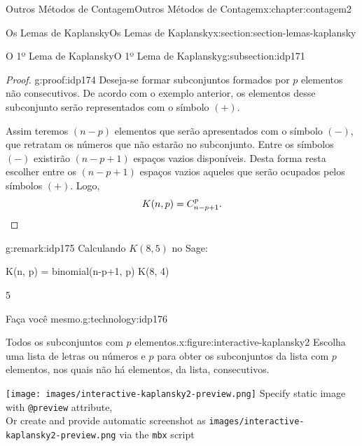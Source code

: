 \documentclass[oneside,10pt,]{book}
\newcommand{\mono}[1]{\texttt{#1}}
\newcommand{\qedhere}{\relax}
\numberwithin{equation}{section}
\newlength{\qrsize}
\newlength{\previewwidth}
\begin{document}
\begin{chapterptx}{Outros Métodos de Contagem}{}{Outros Métodos de Contagem}{}{}{x:chapter:contagem2}
\begin{sectionptx}{Os Lemas de Kaplansky}{}{Os Lemas de Kaplansky}{}{}{x:section:section-lemas-kaplansky}
\begin{subsectionptx}{O 1º Lema de Kaplansky}{}{O 1º Lema de Kaplansky}{}{}{g:subsection:idp171}
\begin{proof}{}{g:proof:idp174}
Deseja-se formar subconjuntos formados por \(p\) elementos não consecutivos. De acordo com o exemplo anterior, os elementos desse subconjunto serão representados com o símbolo \((+)\).%
\par
Assim teremos \((n-p)\) elementos que serão apresentados com o símbolo \((-)\), que retratam os números que não estarão no subconjunto. Entre os símbolos \((-)\) existirão \((n-p+1)\) espaços vazios disponíveis. Desta forma resta escolher entre os \((n-p+1)\) espaços vazios aqueles que serão ocupados pelos símbolos \((+)\). Logo,%
\begin{equation*}
K(n,p)=C_{n-p+1}^p.\qedhere
\end{equation*}
%
\end{proof}
\begin{remark}{}{g:remark:idp175}%
Calculando \(K(8, 5)\) no Sage:%
\begin{sageinput}
K(n, p) = binomial(n-p+1, p) 
K(8, 4)
\end{sageinput}
\begin{sageoutput}
5
\end{sageoutput}
\end{remark}
\begin{technology}{Faça você mesmo.}{g:technology:idp176}%
\begin{figureptx}{Todos os subconjuntos com \(p\) elementos.}{x:figure:interactive-kaplansky2}{}%
\centering
Escolha uma lista de letras ou números e \(p\) para obter os subconjuntos da lista com \(p\) elementos, nos quais não há elementos, da lista, consecutivos.%
\setlength{\qrsize}{9em}
\setlength{\previewwidth}{\linewidth}
\addtolength{\previewwidth}{-\qrsize}
\begin{tcbraster}[raster columns=2, raster column skip=1pt, raster halign=center, raster force size=false, raster left skip=0pt, raster right skip=0pt]%
\begin{tcolorbox}[previewstyle, width=\previewwidth]%
%
{\texttt{[image: images/interactive-kaplansky2-preview.png]}}%
{\small{}Specify static image with \mono{@preview} attribute,\\Or create and provide automatic screenshot as \mono{images/interactive-kaplansky2-preview.png} via the \mono{mbx} script}%
\end{tcolorbox}%
\begin{tcolorbox}[qrstyle]%
{\hypersetup{urlcolor=black}}%
\end{tcolorbox}%
\end{tcbraster}%

\end{figureptx}
\end{technology}
\end{subsectionptx}
\end{sectionptx}
\end{chapterptx}
\end{document}
